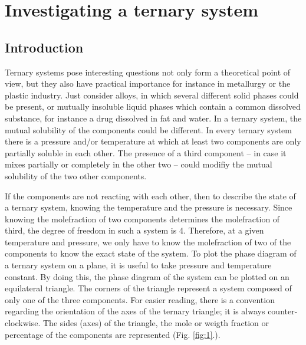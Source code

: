\fancyhead[LO,RE]{\thesection}
\fancyfoot[LE,RO]{\thepage}

\section{Investigating a ternary system}
\subsection{Introduction}

Ternary systems pose interesting questions not only form a theoretical point of view, but they also have practical importance for instance in metallurgy or the plastic industry. Just consider alloys, in which several different solid phases could be present, or mutually insoluble liquid phases which contain a common dissolved substance, for instance a drug dissolved in fat and water. In a ternary system, the mutual solubility of the components could be different. In every ternary system there is a pressure and/or temperature at which at least two components are only partially soluble in each other. The presence of a third component -- in case it mixes partially or completely in the other two -- could modifiy the mutual solubility of the two other components.

If the components are not reacting with each other, then to describe the state of a ternary system, knowing the temperature and the pressure is necessary. Since knowing the molefraction of two components determines the molefraction of third, the degree of freedom in such a system is 4. Therefore, at a given temperature and pressure, we only have to know the molefraction of two of the components to know the exact state of the system. To plot the phase diagram of a ternary system on a plane, it is useful to take pressure and temperature constant. By doing this, the phase diagram of the system can be plotted on an equilateral triangle. The corners of the triangle represent a system composed of only one of the three components. For easier reading, there is a convention regarding the orientation of the axes of the ternary triangle; it is always counter-clockwise. The sides (axes) of the triangle, the mole or weigth fraction or percentage of the components are represented (Fig. \ref{fig:1}.).

